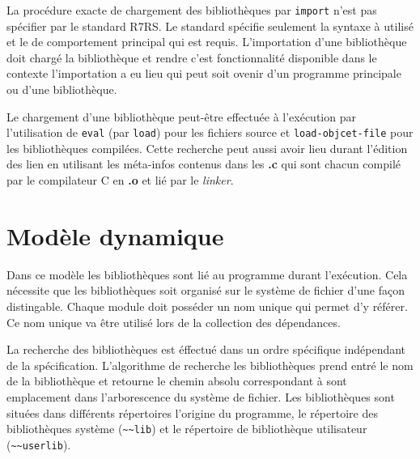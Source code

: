 La procédure exacte de chargement des bibliothèques par \verb|import|
n'est pas spécifier par le standard R7RS. Le standard spécifie seulement la syntaxe
à utilisé et le de comportement principal qui est
requis. L'importation d'une bibliothèque doit chargé la bibliothèque
et rendre c'est fonctionnalité disponible dans le contexte
l'importation a eu lieu qui peut soit ovenir d'un programme principale
ou d'une bibliothèque.

Le chargement d'une bibliothèque peut-être effectuée à l'exécution par
l'utilisation de \texttt{eval} (par \texttt{load}) pour les fichiers source et
\texttt{load-objcet-file} pour les bibliothèques compilées. Cette recherche
peut aussi avoir lieu durant l'édition des lien en utilisant les méta-infos
contenus dans les \textbf{.c} qui sont chacun compilé par le compilateur C
en \textbf{.o} et lié par le \textit{linker}.

\section{Modèle dynamique}
Dans ce modèle les bibliothèques sont lié au programme durant l'exécution. Cela
nécessite que les bibliothèques soit organisé sur le système de fichier d'une façon
distingable. Chaque module doit posséder un nom unique qui permet d'y référer.
Ce nom unique va être utilisé lors de la collection des dépendances.




La recherche des bibliothèques est éffectué dans un ordre spécifique
indépendant de la spécification.  L'algorithme de recherche les bibliothèques
prend entré le nom de la bibliothèque et retourne le chemin absolu
correspondant à sont emplacement dans l'arborescence du système de fichier. Les
bibliothèques sont situées dans différents répertoires l'origine du programme,
le répertoire des bibliothèques système (\lstinline{~~lib}) et le
répertoire de bibliothèque utilisateur (\lstinline{~~userlib}).


